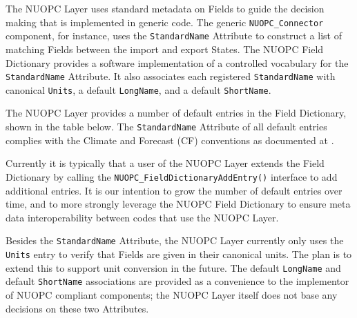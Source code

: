 %

\label{field_dictionary}

The NUOPC Layer uses standard metadata on Fields to guide the decision making that is implemented in generic code. The generic {\tt NUOPC\_Connector} component, for instance, uses the {\tt StandardName} Attribute to construct a list of matching Fields between the import and export States. The NUOPC Field Dictionary provides a software implementation of a controlled vocabulary for the {\tt StandardName} Attribute. It also associates each registered {\tt StandardName} with canonical {\tt Units}, a default {\tt LongName}, and a default {\tt ShortName}.

The NUOPC Layer provides a number of default entries in the Field Dictionary, shown in the table below. The {\tt StandardName} Attribute of all default entries complies with the Climate and Forecast (CF) conventions as documented at . 

Currently it is typically that a user of the NUOPC Layer extends the Field Dictionary by calling the {\tt  NUOPC\_FieldDictionaryAddEntry()} interface to add additional entries. It is our intention to grow the number of default entries over time, and to more strongly leverage the NUOPC Field Dictionary to ensure meta data interoperability between codes that use the NUOPC Layer.

Besides the {\tt StandardName} Attribute, the NUOPC Layer currently only uses the {\tt Units} entry to verify that Fields are given in their canonical units. The plan is to extend this to support unit conversion in the future. The default {\tt LongName} and default {\tt ShortName} associations are provided as a convenience to the implementor of NUOPC compliant components; the NUOPC Layer itself does not base any decisions on these two Attributes.
